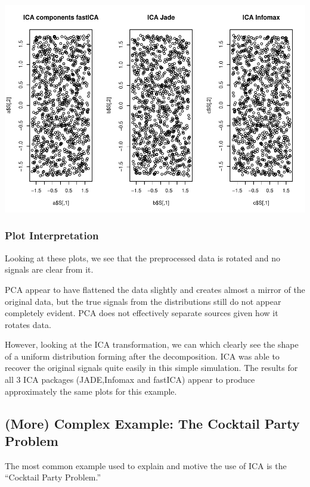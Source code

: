 \documentclass[12pt,twoside]{amherstthesis}
\begin{document}
  \begin{center}\includegraphics{ICA_Stats_Comps_files/figure-latex/unnamed-chunk-1-2} \end{center}
  
  \subsubsection{Plot Interpretation}\label{plot-interpretation}
  
  Looking at these plots, we see that the preprocessed data is rotated and
  no signals are clear from it.
  
  PCA appear to have flattened the data slightly and creates almost a
  mirror of the original data, but the true signals from the distributions
  still do not appear completely evident. PCA does not effectively
  separate sources given how it rotates data.
  
  However, looking at the ICA transformation, we can which clearly see the
  shape of a uniform distribution forming after the decomposition. ICA was
  able to recover the original signals quite easily in this simple
  simulation. The results for all 3 ICA packages (JADE,Infomax and
  fastICA) appear to produce approximately the same plots for this
  example.
  
  \subsection{(More) Complex Example: The Cocktail Party
  Problem}\label{more-complex-example-the-cocktail-party-problem}
  
  The most common example used to explain and motive the use of ICA is the
  ``Cocktail Party Problem.''
  
\end{document}
